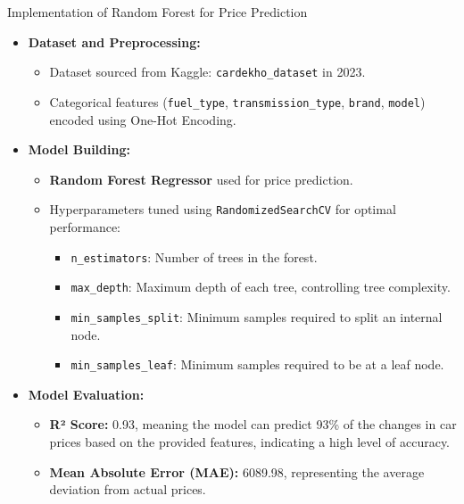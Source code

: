 \documentclass{beamer}
\begin{document}
\begin{frame}{Implementation of Random Forest for Price Prediction}
    \begin{itemize}
        \item \textbf{Dataset and Preprocessing:}
        \begin{itemize}
            \item Dataset sourced from Kaggle: \texttt{cardekho\_dataset} in 2023.
            \item Categorical features (\texttt{fuel\_type}, \texttt{transmission\_type}, \texttt{brand}, \texttt{model}) encoded using One-Hot Encoding.
        \end{itemize}
        
        \item \textbf{Model Building:}
        \begin{itemize}
            \item \textbf{Random Forest Regressor} used for price prediction.
            \item Hyperparameters tuned using \texttt{RandomizedSearchCV} for optimal performance:
            \begin{itemize}
                \item \texttt{n\_estimators}: Number of trees in the forest.
                \item \texttt{max\_depth}: Maximum depth of each tree, controlling tree complexity.
                \item \texttt{min\_samples\_split}: Minimum samples required to split an internal node.
                \item \texttt{min\_samples\_leaf}: Minimum samples required to be at a leaf node.
            \end{itemize}
        \end{itemize}
        
        \item \textbf{Model Evaluation:}
        \begin{itemize}
            \item \textbf{R² Score:} 0.93, meaning the model can predict 93\% of the changes in car prices based on the provided features, indicating a high level of accuracy.
            \item \textbf{Mean Absolute Error (MAE):} 6089.98, representing the average deviation from actual prices.
        \end{itemize}
    \end{itemize}
\end{frame}
\end{document}
